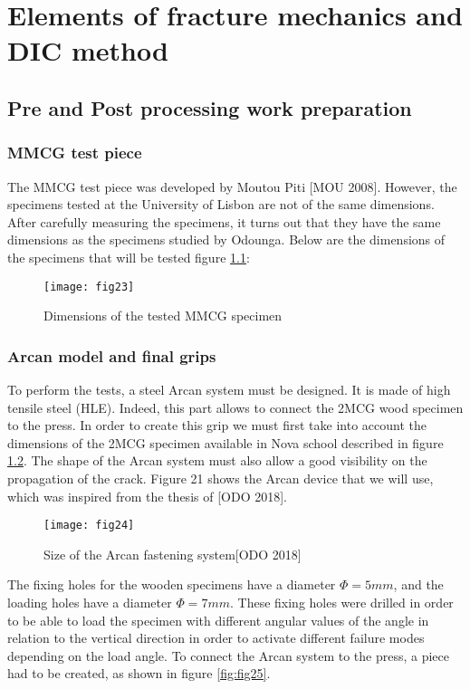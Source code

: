 \chapter{Elements of fracture mechanics and DIC method}
\label{Chapter2}

\section{Pre and Post processing work preparation}

\subsection{MMCG test piece}

The MMCG test piece was developed by Moutou Piti [MOU 2008]. However, the specimens tested at the University of Lisbon are not of the same dimensions. After carefully measuring the specimens, it turns out that they have the same dimensions as the specimens studied by Odounga. Below are the dimensions of the specimens that will be tested figure \ref{fig:fig23}:

\graphicspath{{Images/}}
\begin{figure}[htp]
	\centering
	\texttt{[image: fig23]}
	\caption{Dimensions of the tested MMCG specimen}
	\label{fig:fig23}
\end{figure}

\subsection{Arcan model and final grips}

To perform the tests, a steel Arcan system must be designed. It is made of high tensile steel (HLE). Indeed, this part allows to connect the 2MCG wood specimen to the press. In order to create this grip we must first take into account the dimensions of the 2MCG specimen available in Nova school described in figure \ref{fig:fig24}. The shape of the Arcan system must also allow a good visibility on the propagation of the crack. Figure 21 shows the Arcan device that we will use, which was inspired from the thesis of [ODO 2018].

\graphicspath{{Images/}}
\begin{figure}[htp]
	\centering
	\texttt{[image: fig24]}
	\caption{Size of the Arcan fastening system[ODO 2018]}
	\label{fig:fig24}
\end{figure}

The fixing holes for the wooden specimens have a diameter $\Phi= 5 mm$, and the loading holes have a diameter $\Phi = 7 mm$. These fixing holes were drilled in order to be able to load the specimen with different angular values of the angle in relation to the vertical direction in order to activate different failure modes depending on the load angle. To connect the Arcan system to the press, a piece had to be created, as shown in figure \ref{fig:fig25}.

